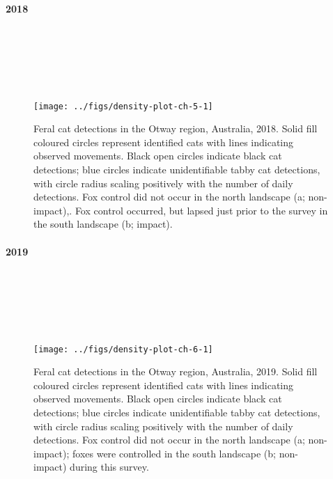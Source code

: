 \documentclass[preprint, 3p, authoryear]{elsarticle} %
\begin{document}
\newpage

\hypertarget{section-1}{%
\paragraph{2018}\label{section-1}}

\(~\)

\(~\)

\(~\)

\begin{figure}

{\centering \texttt{[image: ../figs/density-plot-ch-5-1]} 

}

\caption{Feral cat detections in the Otway region, Australia, 2018. Solid fill coloured circles represent identified cats with lines indicating observed movements. Black open circles indicate black cat detections; blue circles indicate unidentifiable tabby cat detections, with circle radius scaling positively with the number of daily detections. Fox control did not occur in the north landscape (a; non-impact),. Fox control occurred, but lapsed just prior to the survey in the south landscape (b; impact).}\label{fig:density-plot-ch-5}
\end{figure}

\newpage

\hypertarget{section-2}{%
\paragraph{2019}\label{section-2}}

\(~\)

\(~\)

\(~\)

\begin{figure}

{\centering \texttt{[image: ../figs/density-plot-ch-6-1]} 

}

\caption{Feral cat detections in the Otway region, Australia, 2019. Solid fill coloured circles represent identified cats with lines indicating observed movements. Black open circles indicate black cat detections; blue circles indicate unidentifiable tabby cat detections, with circle radius scaling positively with the number of daily detections. Fox control did not occur in the north landscape (a; non-impact); foxes were controlled in the south landscape (b; non-impact) during this survey.}\label{fig:density-plot-ch-6}
\end{figure}
\end{document}
